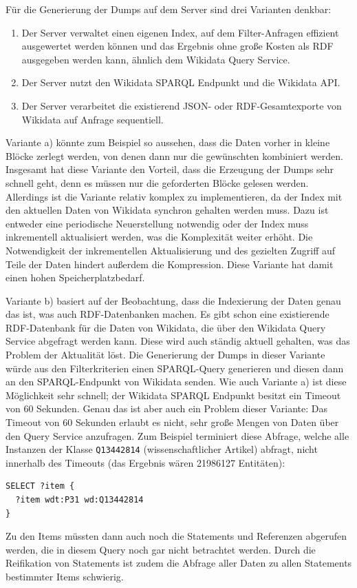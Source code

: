 Für die Generierung der Dumps auf dem Server sind drei Varianten denkbar:
\begin{enumerate}[label=\alph*) ]
  \item Der Server verwaltet einen eigenen Index, auf dem Filter-Anfragen effizient ausgewertet werden können und das Ergebnis ohne große Kosten als RDF ausgegeben werden kann, ähnlich dem Wikidata Query Service.
  \item Der Server nutzt den Wikidata SPARQL Endpunkt und die Wikidata API. 
  \item Der Server verarbeitet die existierend JSON- oder RDF-Gesamtexporte von Wikidata auf Anfrage sequentiell. 
\end{enumerate}
Variante a) könnte zum Beispiel so aussehen, dass die Daten vorher in kleine Blöcke zerlegt werden, von denen dann nur die gewünschten kombiniert werden.
Insgesamt hat diese Variante den Vorteil, dass die Erzeugung der Dumps sehr schnell geht, denn es müssen nur die geforderten Blöcke gelesen werden.
Allerdings ist die Variante relativ komplex zu implementieren, da der Index mit den aktuellen Daten von Wikidata synchron gehalten werden muss.
Dazu ist entweder eine periodische Neuerstellung notwendig oder der Index muss inkrementell aktualisiert werden, was die Komplexität weiter erhöht.
Die Notwendigkeit der inkrementellen Aktualisierung und des gezielten Zugriff auf Teile der Daten hindert außerdem die Kompression.
Diese Variante hat damit einen hohen Speicherplatzbedarf.

Variante b) basiert auf der Beobachtung, dass die Indexierung der Daten genau das ist, was auch RDF-Datenbanken machen.
Es gibt schon eine existierende RDF-Datenbank für die Daten von Wikidata, die über den Wikidata Query Service abgefragt werden kann.
Diese wird auch ständig aktuell gehalten, was das Problem der Aktualität löst.
Die Generierung der Dumps in dieser Variante würde aus den Filterkriterien einen SPARQL-Query generieren und diesen dann an den SPARQL-Endpunkt von Wikidata senden.
Wie auch Variante a) ist diese Möglichkeit sehr schnell; der Wikidata SPARQL Endpunkt besitzt ein Timeout von 60 Sekunden.
Genau das ist aber auch ein Problem dieser Variante: Das Timeout von 60 Sekunden erlaubt es nicht, sehr große Mengen von Daten über den Query Service anzufragen. Zum Beispiel terminiert diese Abfrage, welche alle Instanzen der Klasse \verb|Q13442814| (wissenschaftlicher Artikel) abfragt, nicht innerhalb des Timeouts (das Ergebnis wären 21986127 Entitäten):
\begin{lstlisting}[language=SPARQL, caption=SPARQL-Query nach wissenschaftlichen Artikeln]
SELECT ?item {
  ?item wdt:P31 wd:Q13442814
} 
\end{lstlisting}
Zu den Items müssten dann auch noch die Statements und Referenzen abgerufen werden, die in diesem Query noch gar nicht betrachtet werden.
Durch die Reifikation von Statements ist zudem die Abfrage aller Daten zu allen Statements bestimmter Items schwierig.

